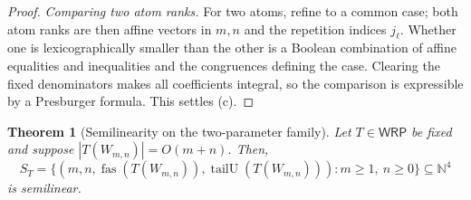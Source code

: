 \documentclass[11pt]{article}
\newtheorem{theorem}{Theorem}[section]
\theoremstyle{definition}
\newcommand{\N}{\mathbb N}
\newcommand{\WRP}{\mathsf{WRP}}
\newcommand{\fas}{\operatorname{fas}}
\newcommand{\tailU}{\operatorname{tailU}}
\begin{document}
\begin{proof}
\vspace{0.5em}
\noindent\emph{Comparing two atom ranks.}  For two atoms, refine to a common case; both
atom ranks are then affine vectors in $m,n$ and the repetition indices $j_\ell$.
Whether one is lexicographically smaller than the other is a Boolean
combination of affine equalities and inequalities and the congruences defining
the case.  Clearing the fixed denominators makes all coefficients integral, so
the comparison is expressible by a Presburger formula.  This
settles (c).
\end{proof}

\begin{theorem}[Semilinearity on the two-parameter family]
\label{thm:two-parameter-semilinearity}
Let $T\in\WRP$ be fixed and suppose $|T(W_{m,n})|=O(m+n)$.  Then,
\[
   S_T=\bigl\{(m,n,\fas(T(W_{m,n})),\tailU(T(W_{m,n}))):m\ge 1,\ n\ge 0\bigr\}
   \subseteq\N^4
\]
is semilinear.
\end{theorem}
\end{document}
